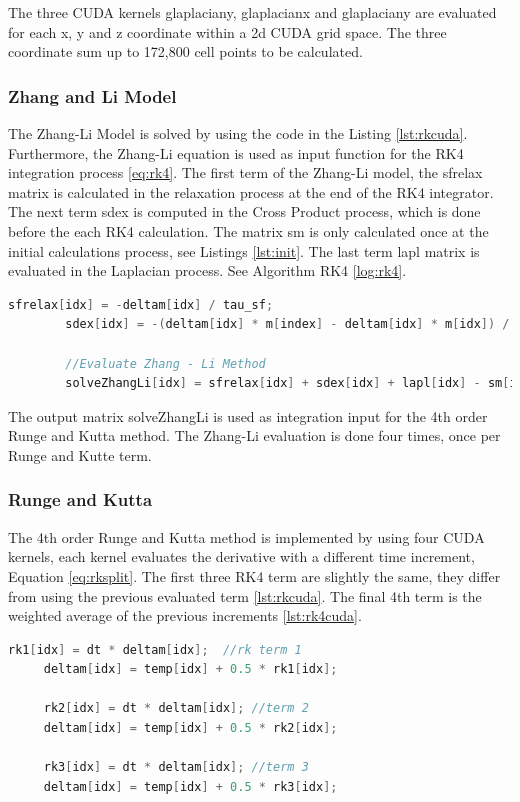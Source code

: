 The three CUDA kernels {\listf glaplaciany}, {\listf glaplacianx} and {\listf glaplaciany} are evaluated for each x, y and z coordinate within a 2d CUDA grid space. The three coordinate sum up to 172,800 cell points to be calculated.

\subsubsection{Zhang and Li Model}

The Zhang-Li Model is solved by using the code in the Listing \ref{lst:rkcuda}. Furthermore, the Zhang-Li equation is used as input function for the RK4 integration process \ref{eq:rk4}. The first term of the Zhang-Li model, the {\listf sfrelax} matrix is calculated in the relaxation process at the end of the RK4 integrator. The next term {\listf sdex} is computed in the Cross Product process, which is done before the each RK4 calculation. The matrix {\listf sm} is only calculated once at the initial calculations process, see Listings \ref{lst:init}. The last term {\listf lapl} matrix is evaluated in the Laplacian process. See Algorithm RK4 \ref{log:rk4}.

\begin{lstlisting}[language=C++, label={lst:zhangcuda}, caption={Zhang-Li evaluation}]
		sfrelax[idx] = -deltam[idx] / tau_sf;
		sdex[idx] = -(deltam[idx] * m[index] - deltam[idx] * m[idx]) / tau_sd;
		
		//Evaluate Zhang - Li Method
        solveZhangLi[idx] = sfrelax[idx] + sdex[idx] + lapl[idx] - sm[idx];
\end{lstlisting}

The output matrix {\listf solveZhangLi} is used as integration input for the 4th order Runge and Kutta method. The Zhang-Li evaluation is done four times, once per Runge and Kutte term.

\subsubsection{Runge and Kutta}
 
The 4th order Runge and Kutta method is implemented by using four CUDA kernels, each kernel evaluates the derivative with a different time increment, Equation \ref{eq:rksplit}. The first three RK4 term are slightly the same, they differ from using the previous evaluated term \ref{lst:rkcuda}. The final 4th term is the weighted average of the previous increments \ref{lst:rk4cuda}.

\begin{lstlisting}[language=C++, label={lst:rkcuda}, caption={Runge and Kutta 1st, 2nd and 3rd terms}]
     rk1[idx] = dt * deltam[idx];  //rk term 1
     deltam[idx] = temp[idx] + 0.5 * rk1[idx];
     
     rk2[idx] = dt * deltam[idx]; //term 2
     deltam[idx] = temp[idx] + 0.5 * rk2[idx];
     
     rk3[idx] = dt * deltam[idx]; //term 3
     deltam[idx] = temp[idx] + 0.5 * rk3[idx];
\end{lstlisting}
    
